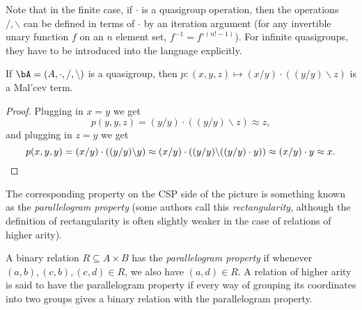 Note that in the finite case, if $\cdot$ is a quasigroup operation, then the operations $/, \backslash$ can be defined in terms of $\cdot$ by an iteration argument (for any invertible unary function $f$ on an $n$ element set, $f^{-1} = f^{\circ (n!-1)}$). For infinite quasigroups, they have to be introduced into the language explicitly.

\begin{prop}\label{prop-quasigroup-malcev} If $\bA = (A, \cdot, /, \backslash)$ is a quasigroup, then $p: (x,y,z) \mapsto (x/y)\cdot((y/y)\backslash z)$ is a Mal'cev term.
\end{prop}
\begin{proof} Plugging in $x=y$ we get
\[
p(y,y,z) = (y/y)\cdot((y/y)\backslash z) \approx z,
\]
and plugging in $z=y$ we get
\[
p(x,y,y) = (x/y)\cdot ((y/y)\backslash y) \approx (x/y)\cdot ((y/y)\backslash ((y/y)\cdot y)) \approx (x/y)\cdot y \approx x.\qedhere
\]
\end{proof}


The corresponding property on the CSP side of the picture is something known as the \emph{parallelogram property} (some authors call this \emph{rectangularity}, although the definition of rectangularity is often slightly weaker in the case of relations of higher arity).

\begin{defn} A binary relation $R \subseteq A\times B$ has the \emph{parallelogram property} if whenever $(a,b), (c,b), (c,d) \in R$, we also have $(a,d) \in R$. A relation of higher arity is said to have the parallelogram property if every way of grouping its coordinates into two groups gives a binary relation with the parallelogram property.
\end{defn}

